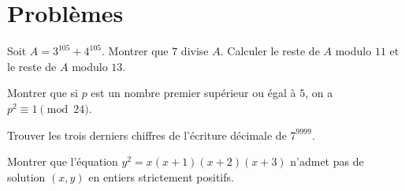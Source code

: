 \section{Problèmes}

\begin{problem}[8]
	Soit $A=3^{105}+4^{105}.$ Montrer que $7$ divise $A.$ Calculer le reste de $A$ modulo $11$ et le reste de $A$ modulo $13.$
	
	\end{problem}

\begin{problem}[17]
	Montrer que si $p$ est un nombre premier supérieur ou égal à $5$, on a $p^2\equiv 1\pmod {24}.$
	
\end{problem}

\begin{problem}[97]
	Trouver les trois derniers chiffres de l'écriture décimale de $7^{9999}.$ 
	
\end{problem}

\begin{problem}[118]
	Montrer que l'équation $y^2=x(x+1)(x+2)(x+3)$ n'admet pas de solution $(x,y)$ en entiers strictement positifs. 

\end{problem}







